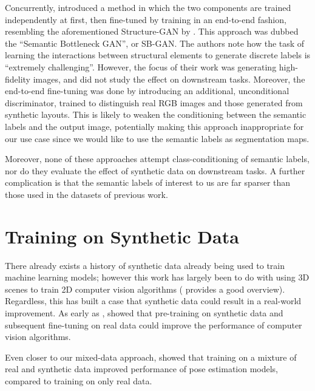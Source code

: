 Concurrently, \citeauthor{azadi2019} \cite{azadi2019} introduced a method in which the two components are trained independently at first, then fine-tuned by training in an end-to-end fashion, resembling the aforementioned Structure-GAN by \citeauthor{wang2016}.
This approach was dubbed the ``Semantic Bottleneck GAN'', or SB-GAN.
The authors note how the task of learning the interactions between structural elements to generate discrete labels is ``extremely challenging''.
However, the focus of their work was generating high-fidelity images, and did not study the effect on downstream tasks.
Moreover, the end-to-end fine-tuning was done by introducing an additional, unconditional discriminator, trained to distinguish real RGB images and those generated from synthetic layouts.
This is likely to weaken the conditioning between the semantic labels and the output image, potentially making this approach inappropriate for our use case since we would like to use the semantic labels as segmentation maps.

Moreover, none of these approaches attempt class-conditioning of semantic labels, nor do they evaluate the effect of synthetic data on downstream tasks.
A further complication is that the semantic labels of interest to us are far sparser than those used in the datasets of previous work.

\section{Training on Synthetic Data}

There already exists a history of synthetic data already being used to train machine learning models; however this work has largely been to do with using 3D scenes to train 2D computer vision algorithms (\cite{gaidon2018} provides a good overview).
Regardless, this has built a case that synthetic data could result in a real-world improvement. 
As early as \citeyear{gaidon2016}, \citeauthor{gaidon2016} \cite{gaidon2016} showed that pre-training on synthetic data and subsequent fine-tuning on real data could improve the performance of computer vision algorithms. 

Even closer to our mixed-data approach, \citeauthor{shrivastava2016} \cite{shrivastava2016} showed that training on a mixture of real and synthetic data improved performance of pose estimation models, compared to training on only real data.

